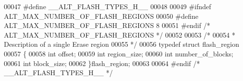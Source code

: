 \begin{DoxyCode}
00047 \textcolor{preprocessor}{#define \_\_ALT\_FLASH\_TYPES\_H\_\_}
00048 
00049 \textcolor{preprocessor}{#ifndef ALT\_MAX\_NUMBER\_OF\_FLASH\_REGIONS}
00050 \textcolor{preprocessor}{#define ALT\_MAX\_NUMBER\_OF\_FLASH\_REGIONS 8}
00051 \textcolor{preprocessor}{#endif }\textcolor{comment}{/* ALT\_MAX\_NUMBER\_OF\_FLASH\_REGIONS */}\textcolor{preprocessor}{}
00052 
00053 \textcolor{comment}{/*}
00054 \textcolor{comment}{ * Description of a single Erase region}
00055 \textcolor{comment}{ */}
00056 \textcolor{keyword}{typedef} \textcolor{keyword}{struct }flash_region
00057 \{
00058   \textcolor{keywordtype}{int}   offset;
00059   \textcolor{keywordtype}{int}   region_size;
00060   \textcolor{keywordtype}{int}   number_of_blocks;
00061   \textcolor{keywordtype}{int}   block_size;
00062 \}flash_region;
00063 
00064 \textcolor{preprocessor}{#endif }\textcolor{comment}{/* \_\_ALT\_FLASH\_TYPES\_H\_\_ */}\textcolor{preprocessor}{}
\end{DoxyCode}
